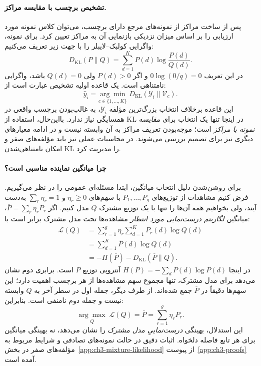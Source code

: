 \paragraph{تشخیص برچسب با مقایسه مراکز.}
پس از ساخت مراکز از نمونه‌های مرجع دارای برچسب، می‌توان کلاس نمونه مورد ارزیابی را بر اساس میزان نزدیکی بازنمایی آن به مراکز تعیین کرد. برای نمونه، واگرایی کولبک--لایبلر را با جهت زیر تعریف می‌کنیم:
\begin{equation}\label{eq:ch3-KL-definition}
D_{\mathrm{KL}}(P\|Q)=\sum_{d=1}^{K}P(d)\log\frac{P(d)}{Q(d)}.
\end{equation}
در این تعریف $0\log(0/q)=0$ و اگر $P(d)>0$ ولی $Q(d)=0$ باشد، واگرایی نامتناهی است. یک قاعده اولیه تشخیص عبارت است از:
\begin{equation}\label{eq:ch3-class-center-decision}
\widehat y_i=
\underset{c\in\{1,\ldots,K\}}{\arg\min}\;
D_{\mathrm{KL}}(\mathscr Y_i\|\mathcal V_c).
\end{equation}
این قاعده برخلاف انتخاب بزرگ‌ترین مؤلفه $\mathscr Y_i$، به غالب‌بودن برچسب واقعی در همسایگی نیاز ندارد. بااین‌حال، استفاده از KL در اینجا تنها یک انتخاب برای \emph{مقایسه نمونه با مراکز} است؛ موجه‌بودن تعریف مراکز به آن وابسته نیست و در ادامه معیارهای دیگری نیز برای تصمیم بررسی می‌شوند. در محاسبات عملی نیز باید مؤلفه‌های صفر و امکان نامتناهی‌شدن KL را مدیریت کرد.

\paragraph{چرا میانگین نماینده مناسبی است؟}
برای روشن‌شدن دلیل انتخاب میانگین، ابتدا مسئله‌ای عمومی را در نظر می‌گیریم. فرض کنیم مشاهدات از توزیع‌های $P_1,\ldots,P_g$ با سهم‌های $\eta_r\ge0$ و $\sum_r\eta_r=1$ به‌دست آیند، ولی بخواهیم همه آن‌ها را تنها با یک توزیع مشترک $Q$ مدل کنیم. اگر $\overline P=\sum_r\eta_rP_r$، میانگین \emph{لگاریتم درست‌نمایی مورد انتظار} مشاهده‌ها تحت مدل مشترک برابر است با:
\begin{equation}\label{eq:ch3-mixture-log-likelihood}
\begin{aligned}
\mathcal L(Q)
&=\sum_{r=1}^{g}\eta_r\sum_{d=1}^{K}P_r(d)\log Q(d)\\
&=\sum_{d=1}^{K}\overline P(d)\log Q(d)\\
&=-H(\overline P)-D_{\mathrm{KL}}(\overline P\|Q).
\end{aligned}
\end{equation}
در اینجا $H(P)=-\sum_dP(d)\log P(d)$ آنتروپی توزیع $P$ است. برابری دوم نشان می‌دهد برای مدل مشترک، تنها مجموع سهم مشاهده‌ها از هر برچسب اهمیت دارد؛ این سهم‌ها دقیقاً در $\overline P$ جمع شده‌اند. از طرف دیگر، جمله اول در سطر آخر به $Q$ وابسته نیست و جمله دوم نامنفی است. بنابراین:
\begin{equation}\label{eq:ch3-mixture-likelihood-optimum}
\boxed{\underset{Q}{\arg\max}\;\mathcal L(Q)=\overline P
=\sum_{r=1}^{g}\eta_rP_r.}
\end{equation}
این استدلال، بهینگی \emph{درست‌نماییِ مدل مشترک} را نشان می‌دهد، نه بهینگی میانگین برای هر تابع فاصله دلخواه. اثبات دقیق در حالت نمونه‌های تصادفی و شرایط مربوط به مؤلفه‌های صفر در بخش~\ref{app:ch3-mixture-likelihood} از پیوست~\ref{app:ch3-proofs} آمده است.


